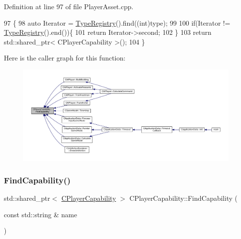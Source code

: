 Definition at line 97 of file Player\+Asset.\+cpp.


\begin{DoxyCode}
97                                                                                              \{
98     \textcolor{keyword}{auto} Iterator = \hyperlink{classCPlayerCapability_ab7fee932703792663278b1b2128f00f3}{TypeRegistry}().find((\textcolor{keywordtype}{int})type);
99     
100     \textcolor{keywordflow}{if}(Iterator != \hyperlink{classCPlayerCapability_ab7fee932703792663278b1b2128f00f3}{TypeRegistry}().end())\{
101         \textcolor{keywordflow}{return} Iterator->second;   
102     \}
103     \textcolor{keywordflow}{return} std::shared\_ptr< CPlayerCapability >();
104 \}
\end{DoxyCode}
Here is the caller graph for this function\+:\nopagebreak
\begin{figure}[H]
\begin{center}
\leavevmode
\includegraphics[width=350pt]{classCPlayerCapability_a881ba4b87385d7cfe5cb6ced2d26f226_icgraph}
\end{center}
\end{figure}
\hypertarget{classCPlayerCapability_aca2e1bf2f3dfdced2ff12f922aa52a30}{}\label{classCPlayerCapability_aca2e1bf2f3dfdced2ff12f922aa52a30} 
\subsubsection{\texorpdfstring{Find\+Capability()}{FindCapability()}\hspace{0.1cm}{\footnotesize\ttfamily [2/2]}}
{\footnotesize\ttfamily std\+::shared\+\_\+ptr$<$ \hyperlink{classCPlayerCapability}{C\+Player\+Capability} $>$ C\+Player\+Capability\+::\+Find\+Capability (\begin{DoxyParamCaption}\item[{const std\+::string \&}]{name }\end{DoxyParamCaption})\hspace{0.3cm}{\ttfamily [static]}}



